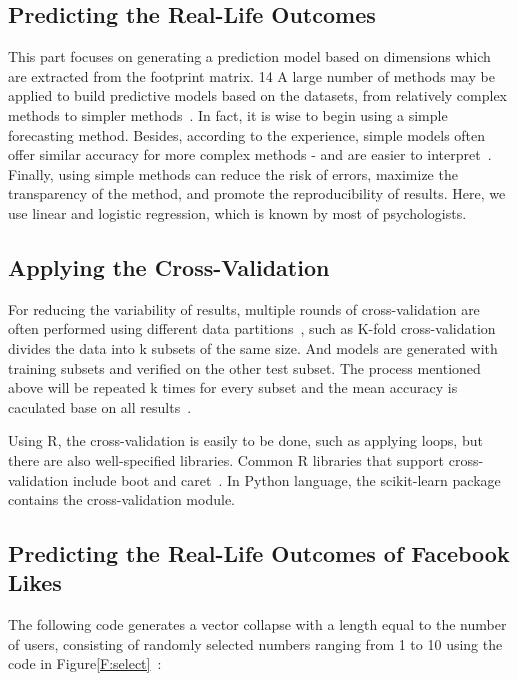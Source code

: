 \subsection{Predicting the Real-Life Outcomes~\cite{hid515-12}}

This part focuses on generating a prediction model based on 
dimensions which are extracted from the footprint matrix.
 14 A large number of methods may be applied to build predictive 
models based on the datasets, from relatively complex methods to 
simpler methods~\cite{hid515-12}. 
In fact, it is wise to begin using a 
simple forecasting method. Besides, according to the 
experience, simple models often offer similar accuracy for more complex 
methods - and are easier to interpret~\cite{hid515-12}. 
Finally, using simple methods can reduce the
 risk of errors, maximize the transparency of the method, and 
promote the reproducibility of results. Here, we use linear
 and logistic regression, which is known by most of psychologists.

\subsection{Applying the Cross-Validation~\cite{hid515-12}}

For reducing the variability of results, multiple rounds of 
cross-validation are often performed using different data 
partitions~\cite{hid515-12}, such as  
K-fold cross-validation divides the data 
into k subsets of the same size. 
And models are generated with training subsets and verified on 
the other test subset. The process mentioned above will be repeated
 k times for every subset and the mean accuracy is caculated base 
on all results~\cite{hid515-12}.

Using R, the cross-validation is easily to be done, 
such as applying loops, but there are also 
well-specified libraries. Common R libraries that support 
cross-validation include boot and caret~\cite{hid515-12}. 
In Python language, the scikit-learn package contains the 
cross-validation module.

\subsection{Predicting the Real-Life Outcomes of
Facebook Likes~\cite{hid515-12}}

The following code generates a vector collapse with a length equal
 to the number of users, consisting of randomly selected numbers 
ranging from 1 to 10 using the code in 
Figure\ref{F:select}~\cite{hid515-12}:

